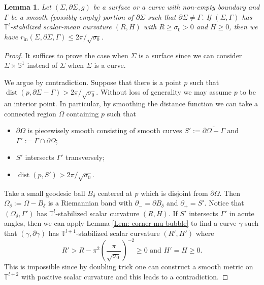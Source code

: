 \documentclass[11pt,letterpaper]{amsart}
\numberwithin{equation}{section}
\newtheorem{lemma}[theorem]{Lemma}
\theoremstyle{definition}
\DeclareMathOperator{\dist}{dist}
\begin{document}
\begin{lemma}\label{Lem: inradius}
Let $(\Sigma,\partial\Sigma,g)$ be a surface or a curve with non-empty boundary and $\Gamma$ be a smooth (possibly empty) portion of $\partial\Sigma$ such that $\partial \Sigma \neq \Gamma$. If $(\Sigma,\Gamma)$ has $\mathbb T^l$-stabilized scalar-mean curvature $(R,H)$ with $R\geq \sigma_0>0$ and $H\geq 0$, then we have $r_{\mathrm{in}}(\Sigma,\partial\Sigma,\Gamma)\leq 2\pi/\sqrt{\sigma_0}$.
\end{lemma}
\begin{proof}
It suffices to prove the case when $\Sigma$ is a surface since we can consider $\Sigma\times \mathbb S^1$ instead of $\Sigma$ when $\Sigma$ is a curve.

We argue by contradiction. Suppose that there is a point $p$ such that $\dist(p,\partial\Sigma-\Gamma)>2\pi/\sqrt{\sigma_0}$. Without loss of generality we may assume $p$ to be an interior point. In particular, by smoothing the distance function we can take a connected region $\Omega$ containing $p$ such that
\begin{itemize}\setlength{\itemsep}{1mm}
\item $\partial\Omega$ is piecewisely smooth consisting of smooth curves $S':=\overline{\partial\Omega-\Gamma}$ and $\Gamma':=\Gamma\cap \partial\Omega$;
\item $S'$ intersects $\Gamma'$ transversely;
\item $\dist(p,S')>2\pi/\sqrt{\sigma_0}$.
\end{itemize}
Take a small geodesic ball $B_\delta$ centered at $p$ which is disjoint from $\partial\Omega$. Then $\Omega_\delta:=\Omega-B_\delta$ is a Riemannian band with $\partial_-=\partial B_\delta$ and $\partial_+=S'$. Notice that $(\Omega_\delta,\Gamma')$ has $\mathbb T^l$-stabilized scalar curvature $(R,H)$. If $S'$ intersects $\Gamma'$ in acute angles, then we can apply Lemma \ref{Lem: corner mu bubble} to find a curve $\gamma$ such that $(\gamma,\partial\gamma)$ has $\mathbb T^{l+1}$-stabilized scalar curvature $(R',H')$ where
$$
R'>R-\pi^2\left(\frac{\pi}{\sqrt{\sigma_0}}\right)^{-2}\geq 0\mbox{ and }H'=H\geq 0.
$$
This is impossible since by doubling trick {\cite[Theorem 5.7]{GL80a}} one can construct a smooth metric on $\mathbb T^{l+2}$ with positive scalar curvature and this leads to a contradiction.


\end{proof}
\end{document}
